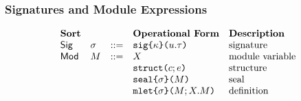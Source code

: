 \subsubsection{Signatures and Module Expressions}
\[\begin{array}{lllllll}
\textbf{Sort} & & & \textbf{Operational Form} 
& \textbf{Description}\\
\mathsf{Sig} & \sigma & ::= & \asignature{\kappa}{u}{\tau} 
& \text{signature}\\
\mathsf{Mod} & M & ::= & X 
& \text{module variable}\\
&&& \astruct{c}{e} 
& \text{structure}\\
&&& \aseal{\sigma}{M} 
& \text{seal}\\
&&& \amlet{\sigma}{M}{X}{M} %
& \text{definition}
\end{array}\]

